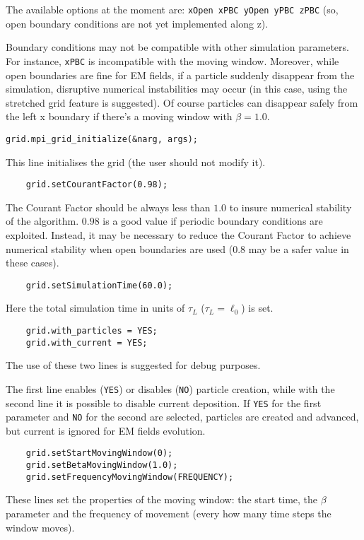 \documentclass[11pt,a4paper]{report}
\begin{document}
The available options at the moment are: \verb+xOpen xPBC yOpen yPBC zPBC+
(so, open boundary conditions are not yet implemented along z).

Boundary conditions may not be compatible with other simulation parameters. For instance, \verb+xPBC+ is incompatible with the moving window. Moreover, while open boundaries are fine for EM fields, if a particle suddenly disappear from the simulation, disruptive numerical instabilities may occur (in this case, using the stretched grid feature is suggested). Of course particles can disappear safely from the left x boundary if there's a moving window with $\beta = 1.0$.

\begin{lstlisting}[backgroundcolor=\color{no_modify}]
	grid.mpi_grid_initialize(&narg, args);
\end{lstlisting}
This line initialises the grid (the user should not modify it).
\begin{lstlisting}
	grid.setCourantFactor(0.98);
\end{lstlisting}
The Courant Factor should be always less than $1.0$ to insure numerical stability of the algorithm. $0.98$ is a good value if periodic boundary conditions are exploited. Instead, it may be necessary to reduce the Courant Factor to achieve numerical stability when open boundaries are used ($0.8$ may be a safer value in these cases).
\begin{lstlisting}
	grid.setSimulationTime(60.0);
\end{lstlisting}
Here the total simulation time in units of $\tau_L$ ($\tau_L=\ell_0$) is set.
\begin{lstlisting}
	grid.with_particles = YES;
	grid.with_current = YES;
\end{lstlisting}
The use of these two lines is suggested for debug purposes.

The first line enables (\verb+YES+) or disables (\verb+NO+) particle creation, while with the second line it is possible to disable current deposition. If \verb+YES+ for the first parameter and \verb+NO+ for the second are selected, particles are created and advanced, but current is ignored for EM fields evolution.
\begin{lstlisting}
	grid.setStartMovingWindow(0);
	grid.setBetaMovingWindow(1.0);
	grid.setFrequencyMovingWindow(FREQUENCY);
\end{lstlisting}
These lines set the properties of the moving window: the start time, the $\beta$ parameter and the frequency of movement (every how many time steps the window moves).
\end{document}
